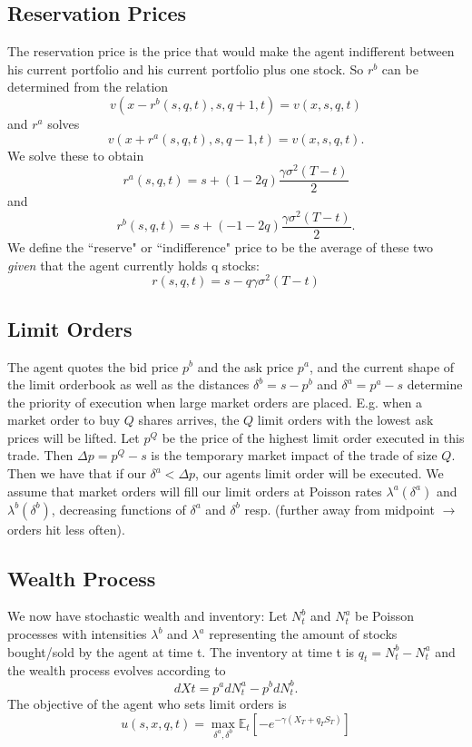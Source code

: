 \documentclass{article}
\begin{document}
\subsection{Reservation Prices}
The reservation price is the price that would make the agent indifferent between his current portfolio and his current portfolio plus one stock. So $r^b$ can be determined from the relation
$$v(x-r^b(s,q,t),s,q+1,t)=v(x,s,q,t)$$
and $r^a$ solves
$$v(x+r^a(s,q,t),s,q-1,t)=v(x,s,q,t).$$
We solve these to obtain
$$r^a(s,q,t)=s+(1-2q)\frac{\gamma\sigma^2(T-t)}{2}$$
and
$$r^b(s,q,t)=s+(-1-2q)\frac{\gamma\sigma^2(T-t)}{2}.$$
We define the ``reserve" or ``indifference" price to be the average of these two \textit{given} that the agent currently holds q stocks:
$$r(s,q,t)=s-q\gamma\sigma^2(T-t)$$
\subsection{Limit Orders}
The agent quotes the bid price $p^b$ and the ask price $p^a$, and the current shape of the limit orderbook as well as the distances $\delta^b=s-p^b$ and $\delta^a=p^a-s$ determine the priority of execution when large market orders are placed. 
E.g. when a market order to buy $Q$ shares arrives, the $Q$ limit orders with the lowest ask prices will be lifted. 
Let $p^Q$ be the price of the highest limit order executed in this trade. Then $\Delta p=p^Q-s$ is the temporary market impact of the trade of size $Q.$ 
Then we have that if our $\delta^a < \Delta p$, our agents limit order will be executed. We assume that market orders will fill our limit orders at Poisson rates $\lambda^a(\delta^a)$ and $\lambda^b(\delta^b)$, decreasing functions of $\delta^a$ and $\delta^b$ resp. 
(further away from midpoint $\rightarrow$ orders hit less often).
\subsection{Wealth Process}
We now have stochastic wealth and inventory: Let $N^b_t$ and $N^a_t$ be Poisson processes with intensities $\lambda^b$ and $\lambda^a$ representing the amount of stocks bought/sold by the agent at time t. The inventory at time t is $q_t=N^b_t-N^a_t$ and the wealth process evolves according to
$$dXt=p^adN^a_t-p^bdN^b_t.$$
The objective of the agent who sets limit orders is 
$$u(s,x,q,t)=\max\limits_{\delta^a,\delta^b}\mathbb{E}_t\left[-e^{-\gamma(X_T+q_TS_T)}\right]$$
\end{document}
